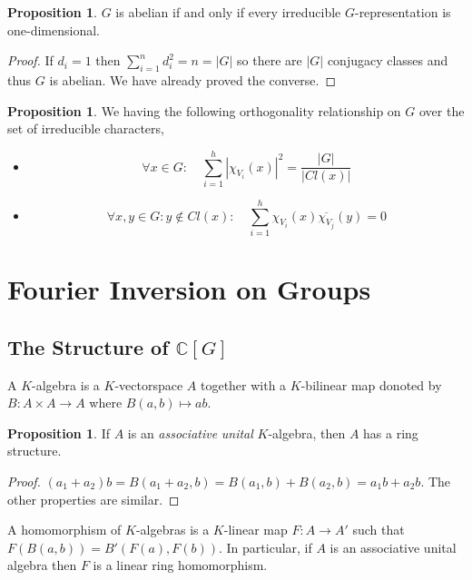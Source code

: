 \documentclass[12pt]{extarticle}
\newcommand{\C}{\mathbb{C}}
\theoremstyle{definition}
\newtheorem{proposition}[theorem]{Proposition}
\newenvironment{definition}[1][Definition:]{\begin{trivlist}
\item[\hskip \labelsep {\bfseries #1}]}{\end{trivlist}}
\begin{document}
\begin{proposition}
$G$ is abelian if and only if every irreducible $G$-representation is one-dimensional.
\end{proposition}

\begin{proof}
If $d_i = 1$ then $\sum_{i = 1}^n d_i^2 = n = |G|$ so there are $|G|$ conjugacy classes and thus $G$ is abelian. We have already proved the converse. 
\end{proof}

\begin{proposition}
We having the following orthogonality relationship on $G$ over the set of irreducible characters,
\begin{itemize}
\item \[ \forall x \in G : \quad \sum_{i = 1}^h | \chi_{V_i} (x) |^2 = \frac{|G|}{|Cl(x)|} \]
\item \[ \forall x, y \in G : y \notin Cl(x) : \quad \sum_{i = 1}^h  \chi_{V_i}(x) \overline{\chi_{V_j}}(y) = 0 \]
\end{itemize}
\end{proposition}

\section{Fourier Inversion on Groups}

\subsection{The Structure of $\C[G]$}

\begin{definition}
A $K$-algebra is a $K$-vectorspace $A$ together with a $K$-bilinear map donoted by $B : A \times A \to A$ where $B(a, b) \mapsto ab$.
\end{definition}

\begin{proposition}
If $A$ is an \textit{associative} \textit{unital} $K$-algebra, then $A$ has a ring structure. 
\end{proposition}

\begin{proof}
$(a_1 + a_2)b = B(a_1 + a_2, b) = B(a_1, b) + B(a_2, b) = a_1 b + a_2 b$. The other properties are similar.
\end{proof}

\begin{definition}
A homomorphism of $K$-algebras is a $K$-linear map $F : A \to A'$ such that $F(B(a, b)) = B'(F(a), F(b))$. In particular, if $A$ is an associative unital algebra then $F$ is a linear ring homomorphism. 
\end{definition}
\end{document}
